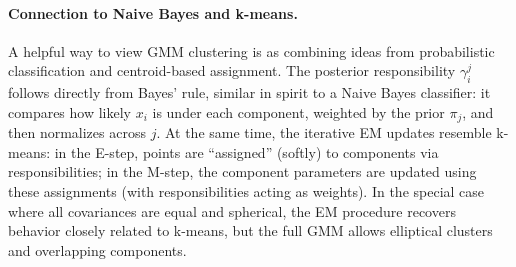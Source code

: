\documentclass{article}
\begin{document}
\paragraph{Connection to Naive Bayes and k-means.}
A helpful way to view GMM clustering is as combining ideas from probabilistic classification and centroid-based assignment. The posterior responsibility $\gamma_i^j$ follows directly from Bayes’ rule, similar in spirit to a Naive Bayes classifier: it compares how likely $x_i$ is under each component, weighted by the prior $\pi_j$, and then normalizes across $j$. At the same time, the iterative EM updates resemble k-means: in the E-step, points are “assigned” (softly) to components via responsibilities; in the M-step, the component parameters are updated using these assignments (with responsibilities acting as weights). In the special case where all covariances are equal and spherical, the EM procedure recovers behavior closely related to k-means, but the full GMM allows elliptical clusters and overlapping components.
\end{document}
